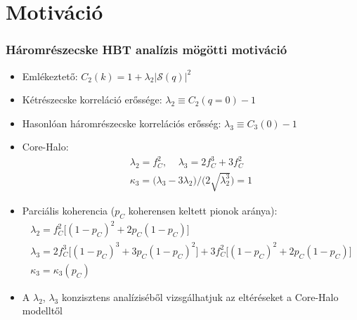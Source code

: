 \documentclass{beamer}
\begin{document}
\section{Motiváció}
\begin{frame}
\frametitle{Háromrészecske HBT analízis mögötti motiváció}
\begin{itemize}
\setlength{\itemsep}{10pt}
\item Emlékeztető: $C_2(k) = 1 + \lambda_2 |\mathcal{S}(q)|^2$
\item Kétrészecske korreláció erőssége: $\lambda_2 \equiv C_2(q=0)-1$
\item Hasonlóan háromrészecske korrelációs erősség: $\lambda_3 \equiv C_3(0)-1$
\item Core-Halo: \vspace*{-15pt}
	\begin{align*}
		\lambda_2=f_C^2,\;\;\;\;\lambda_3 = 2f_C^3+3f_C^2 \\ 
		\kappa_3=\big(\lambda_3-3\lambda_2\big)/\big(2\sqrt{\lambda_2^3}\big)=1
	\end{align*}
\item Parciális koherencia ($p_C$ koherensen keltett pionok aránya): 
	\begin{gather*}
		\lambda_2=f_C^2\big[(1-p_C)^2+2p_C(1-p_C)\big]\\
		\lambda_3=2f_C^3\big[(1-p_C)^3+3p_C(1-p_C)^2\big]+3f_C^2\big[(1-p_C)^2+2p_C(1-p_C)\big]\nonumber\\
		\kappa_3 = \kappa_3(p_C)
	\end{gather*}
\item A $\lambda_2$, $\lambda_3$ konzisztens analíziséből vizsgálhatjuk az eltéréseket a Core-Halo modelltől
\end{itemize}
\end{frame}
\end{document}
